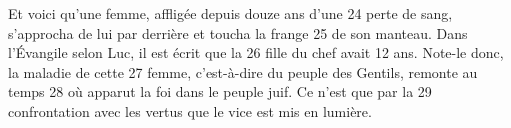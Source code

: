 Et voici qu'une femme, affligée depuis douze ans d'une	 
24	 	perte de sang, s'approcha de lui par derrière et toucha la frange	 
25	 	de son manteau. Dans l'Évangile selon Luc, il est écrit que la	 
26	 	fille du chef avait 12 ans. Note-le donc, la maladie de cette	 
27	 	femme, c'est-à-dire du peuple des Gentils, remonte au temps	 
28	 	où apparut la foi dans le peuple juif. Ce n'est que par la	 
29	 	confrontation avec les vertus que le vice est mis en lumière.
